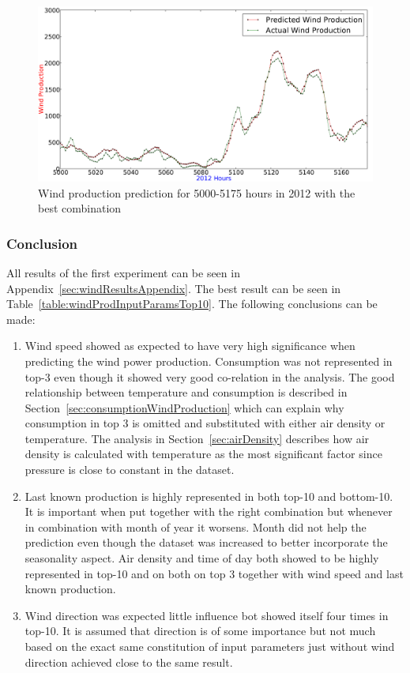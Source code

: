 \begin{figure}[h!]
\centering
\includegraphics[width=0.99\linewidth]{billeder/bestInputParameterLowNumbers.png}
\caption{Wind production prediction for 5000-5175 hours in 2012 with the best combination}
\label{fig:bestInputParameterLowNumbers}
\end{figure}   

\subsubsection{Conclusion}
All results of the first experiment can be seen in Appendix~\ref{sec:windResultsAppendix}. The best result can be seen in Table~\ref{table:windProdInputParamsTop10}. The following conclusions can be made: 

\begin{enumerate}
\item Wind speed showed as expected to have very high significance when predicting the wind power production. Consumption was not represented in top-3 even though it showed very good co-relation in the analysis. The good relationship between temperature and consumption is described in Section~\ref{sec:consumptionWindProduction} which can explain why consumption in top 3 is omitted and substituted with either air density or temperature. The analysis in Section~\ref{sec:airDensity} describes how air density is calculated with temperature as the most significant factor since pressure is close to constant in the dataset.   
\item Last known production is highly represented in both top-10 and bottom-10. It is important when put together with the right combination but whenever in combination with month of year it worsens. Month did not help the prediction even though the dataset was increased to better incorporate the seasonality aspect. Air density and time of day both showed to be highly represented in top-10 and on both on top 3 together with wind speed and last known production.
\item Wind direction was expected little influence bot showed itself four times in top-10. It is assumed that direction is of some importance but not much based on the exact same constitution of input parameters just without wind direction achieved close to the same result.
\end{enumerate}

